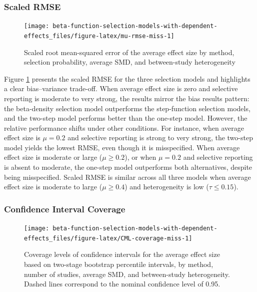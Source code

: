 \documentclass[
  man, donotrepeattitle,floatsintext]{apa7}
\begin{document}
\subsubsection{Scaled RMSE}\label{scaled-rmse-1}

\begin{figure}
\texttt{[image: beta-function-selection-models-with-dependent-effects\_files/figure-latex/mu-rmse-miss-1]} \caption{Scaled root mean-squared error of the average effect size by method, selection probability, average SMD, and between-study heterogeneity}\label{fig:mu-rmse-miss}
\end{figure}

Figure \ref{fig:mu-rmse-miss} presents the scaled RMSE for the three selection models and highlights a clear bias--variance trade-off. When average effect size is zero and selective reporting is moderate to very strong, the results mirror the bias results pattern: the beta-density selection model outperforms the step-function selection models, and the two-step model performs better than the one-step model. However, the relative performance shifts under other conditions. For instance, when average effect size is \(\mu = 0.2\) and selective reporting is strong to very strong, the two-step model yields the lowest RMSE, even though it is misspecified. When average effect size is moderate or large (\(\mu \geq 0.2\)), or when \(\mu = 0.2\) and selective reporting is absent to moderate, the one-step model outperforms both alternatives, despite being misspecified. Scaled RMSE is similar across all three models when average effect size is moderate to large (\(\mu \geq 0.4\)) and heterogeneity is low (\(\tau \leq 0.15\)).

\subsubsection{Confidence Interval Coverage}\label{confidence-interval-coverage-1}

\begin{figure}
\texttt{[image: beta-function-selection-models-with-dependent-effects\_files/figure-latex/CML-coverage-miss-1]} \caption{Coverage levels of confidence intervals for the average effect size based on two-stage bootstrap percentile intervals, by method, number of studies, average SMD, and between-study heterogeneity. Dashed lines correspond to the nominal confidence level of 0.95.}\label{fig:CML-coverage-miss}
\end{figure}
\end{document}
